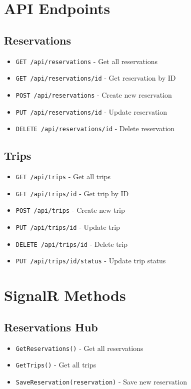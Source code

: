 \section{API Endpoints}

\subsection{Reservations}
\begin{itemize}
    \item \texttt{GET /api/reservations} - Get all reservations
    \item \texttt{GET /api/reservations/{id}} - Get reservation by ID
    \item \texttt{POST /api/reservations} - Create new reservation
    \item \texttt{PUT /api/reservations/{id}} - Update reservation
    \item \texttt{DELETE /api/reservations/{id}} - Delete reservation
\end{itemize}

\subsection{Trips}
\begin{itemize}
    \item \texttt{GET /api/trips} - Get all trips
    \item \texttt{GET /api/trips/{id}} - Get trip by ID
    \item \texttt{POST /api/trips} - Create new trip
    \item \texttt{PUT /api/trips/{id}} - Update trip
    \item \texttt{DELETE /api/trips/{id}} - Delete trip
    \item \texttt{PUT /api/trips/{id}/status} - Update trip status
\end{itemize}

\section{SignalR Methods}

\subsection{Reservations Hub}
\begin{itemize}
    \item \texttt{GetReservations()} - Get all reservations
    \item \texttt{GetTrips()} - Get all trips
    \item \texttt{SaveReservation(reservation)} - Save new reservation
\end{itemize}

